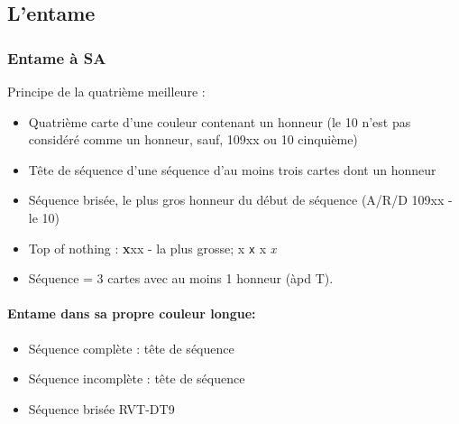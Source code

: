 \documentclass[a4paper]{article}
\begin{document}
\subsection{L'entame}

\subsubsection{Entame à SA}

Principe de la quatrième meilleure :

\begin{itemize}
\item Quatrième carte d'une couleur contenant un honneur (le 10 n'est pas considéré comme un honneur, sauf, 109xx ou 10 cinquième)

\end{itemize}

\begin{itemize}
\item Tête de séquence d'une séquence d'au moins trois cartes dont un honneur

\end{itemize}

\begin{itemize}
\item Séquence brisée, le plus gros honneur du début de séquence (A/R/D 109xx - le 10)

\end{itemize}

\begin{itemize}
\item Top of nothing : \textbf{x}xx - la plus grosse; x \texttt{x} x \emph{x}

\end{itemize}

\begin{itemize}
\item Séquence = 3 cartes avec au moins 1 honneur (àpd T).

\end{itemize}

\paragraph{Entame dans sa propre couleur longue:}

\begin{itemize}
\item Séquence complète : tête de séquence

\item Séquence incomplète : tête de séquence

\item Séquence brisée RVT-DT9

\end{itemize}
\end{document}
